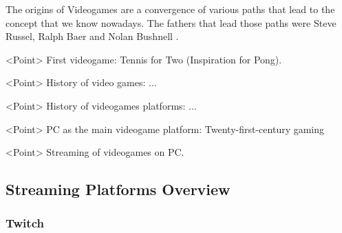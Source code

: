     The origins of Videogames are a convergence of various paths that lead to the concept that we know nowadays. The fathers that lead those paths were Steve Russel, Ralph Baer and Nolan Bushnell \cite{Handbook_ComputerGame_Studies}.
    
    <Point> First videogame: Tennis for Two (Inspiration for Pong).
    
    <Point> History of video games: ...
    
    <Point> History of videogames platforms: ...
    
    <Point> PC as the main videogame platform: Twenty-first-century gaming
    
    <Point> Streaming of videogames on PC.
\subsection{Streaming Platforms Overview}
\subsubsection{Twitch}






